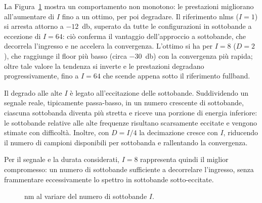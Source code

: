 \documentclass[11pt,a4paper]{article}
\begin{document}
	La Figura~\ref{fig:nm_subband_sweep} mostra un comportamento non monotono: le prestazioni migliorano all'aumentare di $I$ fino a un ottimo, per poi degradare. Il riferimento \ac{nlms} ($I = 1$) si arresta attorno a $-12$~\si{\decibel}, superato da tutte le configurazioni in sottobande a eccezione di $I = 64$: ciò conferma il vantaggio dell'approccio a sottobande, che decorrela l'ingresso e ne accelera la convergenza. L'ottimo si ha per $I = 8$ ($D = 2$), che raggiunge il floor più basso (circa $-30$~\si{\decibel}) con la convergenza più rapida; oltre tale valore la tendenza si inverte e le prestazioni degradano progressivamente, fino a $I = 64$ che scende appena sotto il riferimento fullband.
	
	Il degrado alle alte $I$ è legato all'eccitazione delle sottobande. Suddividendo un segnale reale, tipicamente passa-basso, in un numero crescente di sottobande, ciascuna sottobanda diventa più stretta e riceve una porzione di energia inferiore: le sottobande relative alle alte frequenze risultano scarsamente eccitate e vengono stimate con difficoltà. Inoltre, con $D = I/4$ la decimazione cresce con $I$, riducendo il numero di campioni disponibili per sottobanda e rallentando la convergenza.
	
	Per il segnale e la durata considerati, $I = 8$ rappresenta quindi il miglior compromesso: un numero di sottobande sufficiente a decorrelare l'ingresso, senza frammentare eccessivamente lo spettro in sottobande sotto-eccitate.
	\begin{figure}[H]
		\centering
		\caption{\ac{nm} al variare del numero di sottobande $I$.}
		\label{fig:nm_subband_sweep}
	\end{figure}
	
\end{document}
